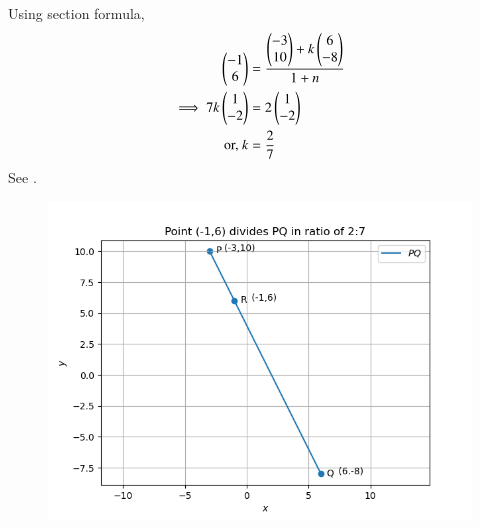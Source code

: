 Using section formula,
\begin{align}
         \begin{pmatrix}-1\\6\end{pmatrix} &=\frac{{\begin{pmatrix}-3\\10\end{pmatrix}+k\begin{pmatrix}6\\-8\end{pmatrix}}}{1+n}\\
	 \implies 7k\begin{pmatrix}1 \\ -2\end{pmatrix} &= 2\begin{pmatrix}1 \\ -2\end{pmatrix}
	 \\
	 \text{or, } k &= \frac{2}{7}
\end{align}
See .
\begin{figure}[!h]
 \begin{center}
  \includegraphics[width=\columnwidth]{chapters/10/7/2/4/figs/fig.png}
 \end{center}
\caption{}
\label{fig:10/7/2/4Fig1}
\end{figure}
